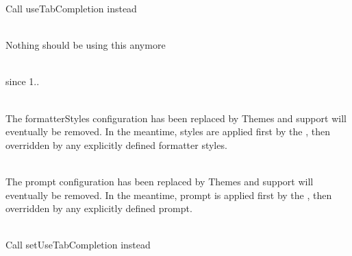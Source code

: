 \begin{DoxyRefList}
\label{deprecated__deprecated000329}%
%
Call {\ttfamily use\+Tab\+Completion} instead  
\item[Global \doxylink{class_psy_1_1_configuration_a33f421ac164a48e166a356f5501ae372}{Configuration\+::get\+Tab\+Completion\+Matchers} ()]\hfill \\
\label{deprecated__deprecated000330}%
%
Nothing should be using this anymore  
\item[Global \doxylink{class_mockery_1_1_configuration_a55156f2eaab968dc7df12d1fcaac056d}{Configuration\+::mocking\+Methods\+Unnecessarily\+Allowed} ()]\hfill \\
\label{deprecated__deprecated000166}%
%
since 1..  
\item[Global \doxylink{class_psy_1_1_configuration_a1d27db21baa46b3c0cb805eab8c62bb3}{Configuration\+::set\+Formatter\+Styles} (array \$formatter\+Styles)]\hfill \\
\label{deprecated__deprecated000333}%
%
The {\ttfamily formatter\+Styles} configuration has been replaced by Themes and support will eventually be removed. In the meantime, styles are applied first by the , then overridden by any explicitly defined formatter styles.  
\item[Global \doxylink{class_psy_1_1_configuration_a07e9d71663bed15c22c170d34dba8d61}{Configuration\+::set\+Prompt} (string \$prompt)]\hfill \\
\label{deprecated__deprecated000332}%
%
The {\ttfamily prompt} configuration has been replaced by Themes and support will eventually be removed. In the meantime, prompt is applied first by the , then overridden by any explicitly defined prompt. 
\item[Global \doxylink{class_psy_1_1_configuration_a98088f74352af1580f1eee48e011dbe6}{Configuration\+::set\+Tab\+Completion} (bool \$use\+Tab\+Completion)]\hfill \\
\label{deprecated__deprecated000328}%
%
Call {\ttfamily set\+Use\+Tab\+Completion} instead 
\item[Global \doxylink{class_illuminate_1_1_redis_1_1_connections_1_1_connection_af2ed0944d8bd90b71f9e64ddaac0a399}{Connection\+::event} (\$event)]\hfill \\

\end{DoxyRefList}
